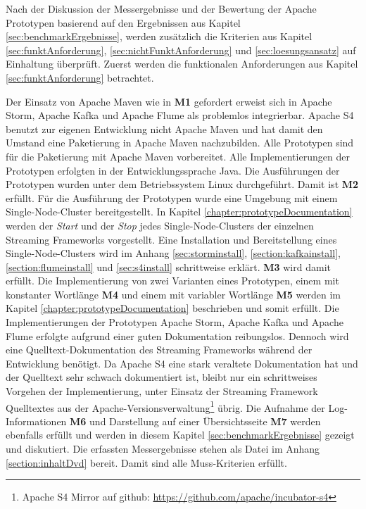 Nach der Diskussion der Messergebnisse und der Bewertung der Apache Prototypen basierend auf den Ergebnissen aus Kapitel \ref{sec:benchmarkErgebnisse}, werden zusätzlich die Kriterien aus Kapitel \ref{sec:funktAnforderung}, \ref{sec:nichtFunktAnforderung} und \ref{sec:loesungsansatz} auf Einhaltung überprüft. Zuerst werden die funktionalen Anforderungen aus Kapitel \ref{sec:funktAnforderung} betrachtet.

Der Einsatz von Apache Maven wie in \textbf{M1} gefordert erweist sich in Apache Storm, Apache Kafka und Apache Flume als problemlos integrierbar. Apache S4 benutzt zur eigenen Entwicklung nicht Apache Maven und hat damit den Umstand eine Paketierung in Apache Maven nachzubilden. Alle Prototypen sind für die Paketierung mit Apache Maven vorbereitet. Alle Implementierungen der Prototypen erfolgten in der Entwicklungssprache Java. Die Ausführungen der Prototypen wurden unter dem Betriebssystem Linux durchgeführt. Damit ist \textbf{M2} erfüllt. Für die Ausführung der Prototypen wurde eine Umgebung mit einem Single-Node-Cluster bereitgestellt. In Kapitel \ref{chapter:prototypeDocumentation} werden der \textit{Start} und der \textit{Stop} jedes Single-Node-Clusters der einzelnen Streaming Frameworks vorgestellt. Eine Installation und Bereitstellung eines Single-Node-Clusters wird im Anhang \ref{sec:storminstall}, \ref{section:kafkainstall}, \ref{section:flumeinstall} und \ref{sec:s4install} schrittweise erklärt. \textbf{M3} wird damit erfüllt. Die Implementierung von zwei Varianten eines Prototypen, einem mit konstanter Wortlänge \textbf{M4} und einem mit variabler Wortlänge \textbf{M5} werden im Kapitel \ref{chapter:prototypeDocumentation} beschrieben und somit erfüllt. Die Implementierungen der Prototypen Apache Storm, Apache Kafka und Apache Flume erfolgte aufgrund einer guten Dokumentation reibungslos. Dennoch wird eine Quelltext-Dokumentation des Streaming Frameworks während der Entwicklung benötigt. Da Apache S4 eine stark veraltete Dokumentation hat und der Quelltext sehr schwach dokumentiert ist, bleibt nur ein schrittweises Vorgehen der Implementierung, unter Einsatz der Streaming Framework Quelltextes aus der Apache-Versionsverwaltung\footnote{Apache S4 Mirror auf github: \url{https://github.com/apache/incubator-s4}} übrig. Die Aufnahme der Log-Informationen \textbf{M6} und Darstellung auf einer Übersichtsseite \textbf{M7} werden ebenfalls erfüllt und werden in diesem Kapitel \ref{sec:benchmarkErgebnisse} gezeigt und diskutiert. Die erfassten Messergebnisse stehen als Datei im Anhang \ref{section:inhaltDvd} bereit. Damit sind alle Muss-Kriterien erfüllt.

